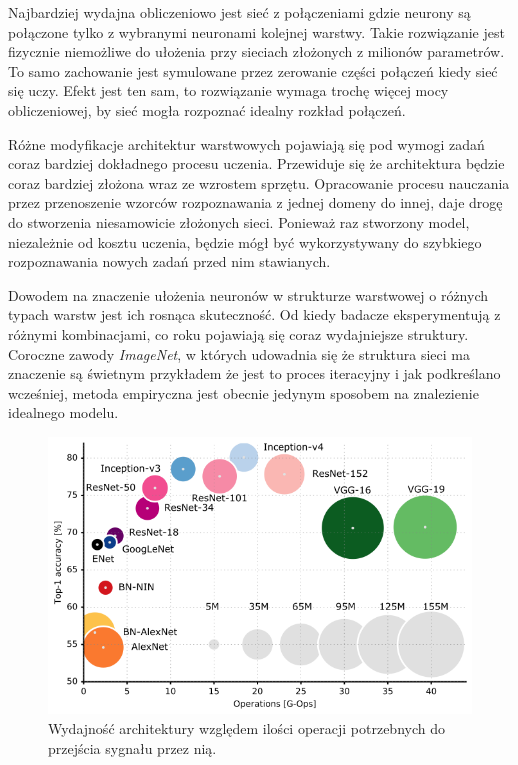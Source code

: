 \documentclass[12pt,a4paper,twoside,titlepage,openright]{book}
\begin{document}
Najbardziej wydajna obliczeniowo jest sieć z połączeniami gdzie neurony są połączone tylko z wybranymi neuronami kolejnej warstwy. Takie rozwiązanie jest fizycznie niemożliwe do ułożenia przy sieciach złożonych z milionów parametrów. To samo zachowanie jest symulowane przez zerowanie części połączeń kiedy sieć się uczy. Efekt jest ten sam, to rozwiązanie wymaga trochę więcej mocy obliczeniowej, by sieć mogła rozpoznać idealny rozkład połączeń.

Różne modyfikacje architektur warstwowych pojawiają się pod wymogi zadań coraz bardziej dokładnego procesu uczenia. Przewiduje się że architektura będzie coraz bardziej złożona wraz ze wzrostem sprzętu. Opracowanie procesu nauczania przez przenoszenie wzorców rozpoznawania z jednej domeny do innej, daje drogę do stworzenia niesamowicie złożonych sieci. Ponieważ raz stworzony model, niezależnie od kosztu uczenia, będzie mógł być wykorzystywany do szybkiego rozpoznawania nowych zadań przed nim stawianych.

Dowodem na znaczenie ułożenia neuronów w strukturze warstwowej o różnych typach warstw jest ich rosnąca skuteczność. Od kiedy badacze eksperymentują z różnymi kombinacjami, co roku pojawiają się coraz wydajniejsze struktury. Coroczne zawody \textit{ImageNet}, w których udowadnia się że struktura sieci ma znaczenie są świetnym przykładem że jest to proces iteracyjny i jak podkreślano wcześniej, metoda empiryczna jest obecnie jedynym sposobem na znalezienie idealnego modelu.

\begin{figure}[h]
	\centering
			\includegraphics[resolution=100, scale=0.6]{architecturePerformance.png}
		\caption{Wydajność architektury względem ilości operacji potrzebnych do przejścia sygnału przez nią.}
\end{figure}
\end{document}
